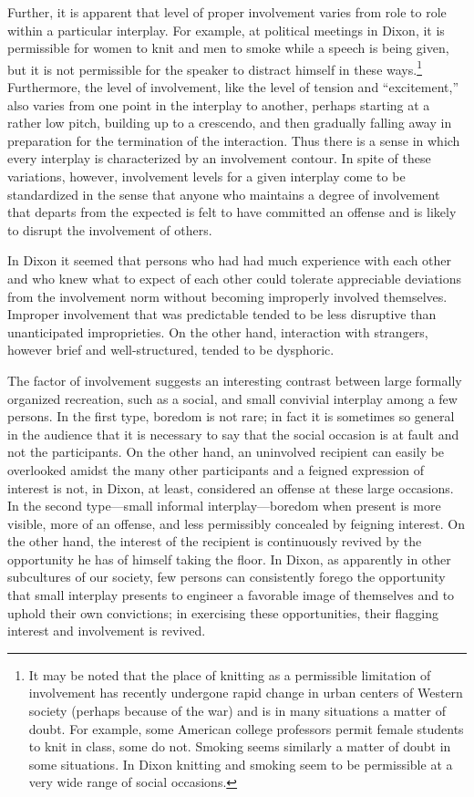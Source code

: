\documentclass[twoside,symmetric,nobib,justified]{tufte-book}
\begin{document}
Further, it is apparent that level of proper involvement varies from
role to role within a particular interplay. For example, at political
meetings in Dixon, it is permissible for women to knit and men to smoke
while a speech is being given, but it is not permissible for the speaker
to distract himself in these ways.\footnote{It may be noted that the
  place of knitting as a permissible limitation of involvement has
  recently undergone rapid change in urban centers of Western society
  (perhaps because of the war) and is in many situations a matter of
  doubt. For example, some American college professors permit female
  students to knit in class, some do not. Smoking seems similarly a
  matter of doubt in some situations. In Dixon knitting and smoking seem
  to be permissible at a very wide range of social occasions.}
Furthermore, the level of involvement, like the level of tension and
``excitement,'' also varies from one point in the interplay to another,
perhaps starting at a rather low pitch, building up to a crescendo, and
then gradually falling away in preparation for the termination of the
interaction. Thus there is a sense in which every interplay is
characterized by an involvement contour. In spite of these variations,
however, involvement levels for a given interplay come to be
standardized in the sense that anyone who maintains a degree of
involvement that departs from the expected is felt to have committed an
offense and is likely to disrupt the involvement of others.

\enlargethispage{\baselineskip}

In Dixon it seemed that persons who had had much experience with each
other and who knew what to expect of each other could tolerate
appreciable deviations from the involvement norm without becoming
improperly involved themselves. Improper involvement that was
predictable tended to be less disruptive than unanticipated
improprieties. On the other hand, interaction with strangers, however
brief and well-structured, tended to be dysphoric.

The factor of involvement suggests an interesting contrast between large
formally organized recreation, such as a social, and small convivial
interplay among a few persons. In the first type, boredom is not rare;
in fact it is sometimes so general in the audience that it is necessary
to say that the social occasion is at fault and not the participants. On
the other hand, an uninvolved recipient can easily be overlooked amidst
the many other participants and a feigned expression of interest is not,
in Dixon, at least, considered an offense at these large occasions. In
the second type---small informal interplay---boredom when present is
more visible, more of an offense, and less permissibly concealed by
feigning interest. On the other hand, the interest of the recipient is
continuously revived by the opportunity he has of himself taking the
floor. In Dixon, as apparently in other subcultures of our society, few
persons can consistently forego the opportunity that small interplay
presents to engineer a favorable image of themselves and to uphold their
own convictions; in exercising these opportunities, their flagging
interest and involvement is revived.
\end{document}
